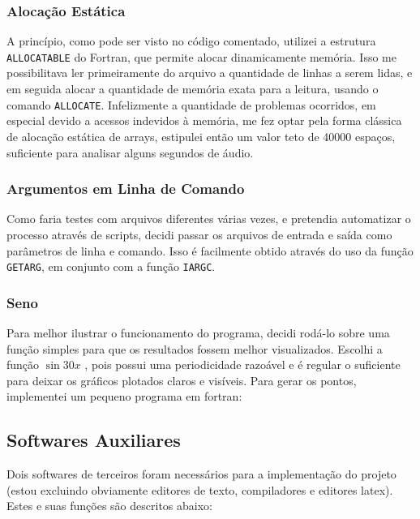 \subsubsection{Alocação Estática}

A princípio, como pode ser visto no código comentado, utilizei a estrutura \texttt{ALLOCATABLE} do Fortran, que permite alocar dinamicamente memória. Isso me possibilitava ler primeiramente do arquivo a quantidade de linhas a serem lidas, e em seguida alocar a quantidade de memória exata para a leitura, usando o comando \texttt{ALLOCATE}. Infelizmente a quantidade de problemas ocorridos, em especial devido a acessos indevidos à memória, me fez optar pela forma clássica de alocação estática de arrays, estipulei então um valor teto de 40000 espaços, suficiente para analisar alguns segundos de áudio.

\subsubsection{Argumentos em Linha de Comando}

Como faria testes com arquivos diferentes várias vezes, e pretendia automatizar o processo através de scripts, decidi passar os arquivos de entrada e saída como parâmetros de linha e comando. Isso é facilmente obtido através do uso da função \texttt{GETARG}, em conjunto com a função \texttt{IARGC}.

\subsubsection{Seno}

Para melhor ilustrar o funcionamento do programa, decidi rodá-lo sobre uma função simples para que os resultados fossem melhor visualizados. Escolhi a função $ \sin{30x}$ , pois possui uma periodicidade razoável e é regular o suficiente para deixar os gráficos plotados claros e visíveis. Para gerar os pontos, implementei um pequeno programa em fortran:



\subsection{Softwares Auxiliares}

Dois softwares de terceiros foram necessários para a implementação do projeto (estou excluindo obviamente editores de texto, compiladores e editores latex). Estes e suas funções são descritos abaixo:

